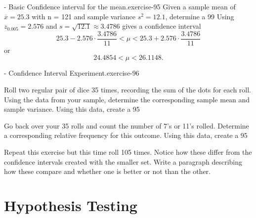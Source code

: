 \documentclass[10pt,]{book}
\numberwithin{equation}{section}
\newcommand{\lt}{<}
\begin{document}
 \begin{inlineexercise}{- Basic Confidence interval for the mean.}{exercise-95}%
\hypertarget{p-1356}{}%
Given a sample mean of \(\overline{x} = 25.3\) with n = 121 and sample variance \(s^2 = 12.1\), determine a 99%
\hypertarget{p-1357}{}%
Using \(z_{0.005} = 2.576\) and \(s = \sqrt{12.1} \approx 3.4786\) gives a confidence interval%
\begin{equation*}
25.3 - 2.576 \cdot \frac{3.4786}{11} \lt \mu \lt 25.3 + 2.576 \cdot \frac{3.4786}{11}
\end{equation*}
or%
\begin{equation*}
24.4854 \lt \mu \lt 26.1148.
\end{equation*}
%
%
\end{inlineexercise}
 \begin{inlineexercise}{- Confidence Interval Experiment.}{exercise-96}%
\hypertarget{p-1358}{}%
%
\end{inlineexercise}
 Roll two regular pair of dice 35 times, recording the sum of the dots for each roll.  Using the data from your sample, determine the corresponding sample mean and sample variance.  Using this data, create a 95%
\par
\hypertarget{p-1359}{}%
Go back over your 35 rolls and count the number of 7's or 11's rolled. Determine a corresponding relative frequency for this outcome. Using this data, create a 95%
\par
\hypertarget{p-1360}{}%
Repeat this exercise but this time roll 105 times.  Notice how these differ from the confidence intervals created with the smaller set.  Write a paragraph describing how these compare and whether one is better or not than the other.%
%
%
\typeout{************************************************}
\typeout{************************************************}
%
\chapter[{Hypothesis Testing}]{Hypothesis Testing}\label{HypothesisTesting}
%
%
\typeout{************************************************}
\typeout{************************************************}
%
\end{document}
